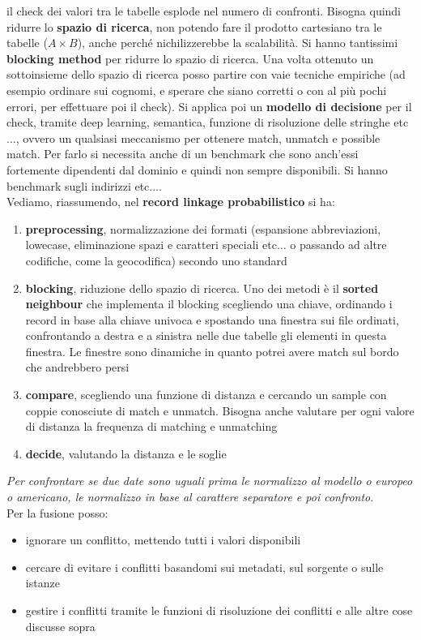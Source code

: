\documentclass[a4paper,12pt, oneside]{book}
\begin{document}
il check dei valori tra le tabelle esplode nel numero di confronti. Bisogna
quindi ridurre lo \textbf{spazio di ricerca}, non potendo fare il prodotto
cartesiano tra le tabelle ($ A\times B$), anche perché nichilizzerebbe la
scalabilità. Si hanno tantissimi \textbf{blocking method} per ridurre lo spazio
di ricerca. Una volta ottenuto un sottoinsieme dello spazio di ricerca posso
partire con vaie tecniche empiriche (ad esempio ordinare sui cognomi, e sperare
che siano corretti o con al più pochi errori, per effettuare poi il check). Si
applica poi un \textbf{modello di decisione} per il check, tramite deep
learning, semantica, funzione di risoluzione delle stringhe etc$\ldots$, ovvero
un qualsiasi meccanismo per ottenere match, unmatch e possible match. Per farlo
si necessita anche di un benchmark che sono anch'essi fortemente dipendenti dal
dominio e quindi non sempre disponibili. Si hanno benchmark sugli indirizzi
etc$\ldots$. \\
Vediamo, riassumendo, nel \textbf{record linkage probabilistico} si ha:
\begin{enumerate}
  \item \textbf{preprocessing}, normalizzazione dei formati (espansione
  abbreviazioni, lowecase, eliminazione spazi e caratteri speciali etc$\ldots$ o
  passando ad altre 
  codifiche, come la geocodifica) secondo uno standard
  \item \textbf{blocking}, riduzione dello spazio di ricerca. Uno dei metodi è
  il \textbf{sorted neighbour} che implementa il blocking scegliendo una
  chiave, ordinando i record in base alla chiave univoca e spostando una
  finestra sui file ordinati, confrontando a destra e a sinistra nelle due
  tabelle gli elementi in questa finestra. Le finestre sono dinamiche in quanto
  potrei avere match sul bordo che andrebbero persi
  
  \item \textbf{compare}, scegliendo una funzione di distanza e cercando un
  sample con coppie conosciute di match e unmatch. Bisogna anche valutare per
  ogni valore di distanza la frequenza di 
  matching e unmatching
  \item \textbf{decide}, valutando la distanza e le soglie
\end{enumerate}
\textit{Per confrontare se due date sono uguali prima le normalizzo al modello o
europeo o americano, le normalizzo in base al carattere separatore e poi
confronto}.\\
Per la fusione posso:
\begin{itemize}
  \item ignorare un conflitto, mettendo tutti i valori disponibili
  \item cercare di evitare i conflitti basandomi sui metadati, sul sorgente o
  sulle istanze  
  \item gestire i conflitti tramite le funzioni di risoluzione dei conflitti e
  alle altre cose discusse sopra
\end{itemize}
\end{document}
